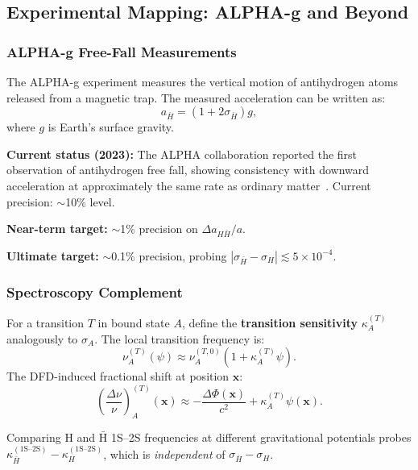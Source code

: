 \subsection{Experimental Mapping: ALPHA-g and Beyond}\label{sec:antimatter-experiments}

\subsubsection{ALPHA-g Free-Fall Measurements}

The ALPHA-g experiment measures the vertical motion of antihydrogen atoms 
released from a magnetic trap. The measured acceleration can be written as:
\begin{equation}
a_{\bar{H}} = (1 + 2\sigma_{\bar{H}})g,
\end{equation}
where $g$ is Earth's surface gravity.

\textbf{Current status (2023):} The ALPHA collaboration reported the first 
observation of antihydrogen free fall, showing consistency with downward 
acceleration at approximately the same rate as ordinary matter~\cite{ALPHA2023Nature}. 
Current precision: $\sim$10\% level.

\textbf{Near-term target:} $\sim$1\% precision on $\Delta a_{H\bar{H}}/a$.

\textbf{Ultimate target:} $\sim$0.1\% precision, probing 
$|\sigma_{\bar{H}} - \sigma_H| \lesssim 5 \times 10^{-4}$.

\subsubsection{Spectroscopy Complement}

For a transition $T$ in bound state $A$, define the \textbf{transition sensitivity} 
$\kappa_A^{(T)}$ analogously to $\sigma_A$. The local transition frequency is:
\begin{equation}
\nu_A^{(T)}(\psi) \approx \nu_A^{(T,0)}(1 + \kappa_A^{(T)}\psi).
\end{equation}
The DFD-induced fractional shift at position $\mathbf{x}$:
\begin{equation}
\left(\frac{\Delta\nu}{\nu}\right)_A^{(T)}(\mathbf{x}) \approx -\frac{\Delta\Phi(\mathbf{x})}{c^2} + \kappa_A^{(T)}\psi(\mathbf{x}).
\end{equation}

Comparing H and $\bar{\text{H}}$ 1S--2S frequencies at different gravitational 
potentials probes $\kappa_{\bar{H}}^{(\text{1S--2S})} - \kappa_H^{(\text{1S--2S})}$, 
which is \textit{independent} of $\sigma_{\bar{H}} - \sigma_H$.

